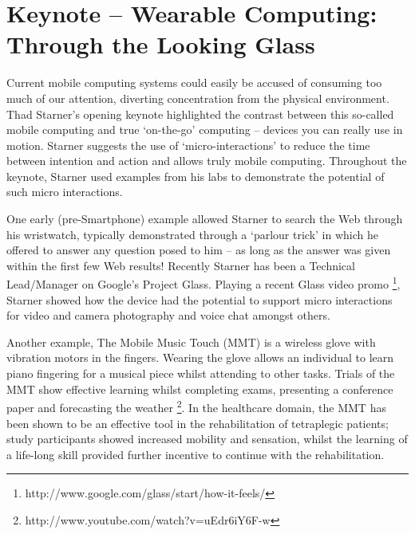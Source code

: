 \section{Keynote -- Wearable Computing: Through the Looking Glass}
\label{sec:keynote}
Current mobile computing systems could easily be accused of consuming too much
of our attention, diverting concentration from the physical environment. Thad
Starner's opening keynote highlighted the contrast between this so-called
mobile computing and true `on-the-go' computing -- devices you can really use in
motion. Starner suggests the use of `micro-interactions' to reduce the time 
between intention and action and allows truly mobile computing. Throughout the 
keynote, Starner used examples from his labs to demonstrate the potential of such 
micro interactions.


One early (pre-Smartphone) example allowed Starner to search the Web through
his wristwatch, typically demonstrated through a `parlour trick' in which he
offered to answer any question posed to him -- as long as the answer was given
within the first few Web results!
Recently Starner has been a Technical Lead\slash Manager on Google's Project 
Glass. Playing a recent Glass video promo
\footnote{http://www.google.com/glass/start/how-it-feels/}, Starner showed how 
the device had the potential to support micro interactions for video and camera 
photography and voice chat amongst others.

Another example, The Mobile Music Touch (MMT) is a wireless glove
with vibration motors in the fingers. Wearing the glove allows an individual to
learn piano fingering for a musical piece whilst attending to other tasks.
Trials of the MMT show effective learning whilst completing exams, presenting a
conference paper and forecasting the weather
\footnote{http://www.youtube.com/watch?v=uEdr6iY6F-w}. In the healthcare domain,
the MMT has been shown to be an effective tool in the rehabilitation of
tetraplegic patients; study participants showed increased mobility and sensation, 
whilst the learning of a life-long skill provided further incentive to continue 
with the rehabilitation.

